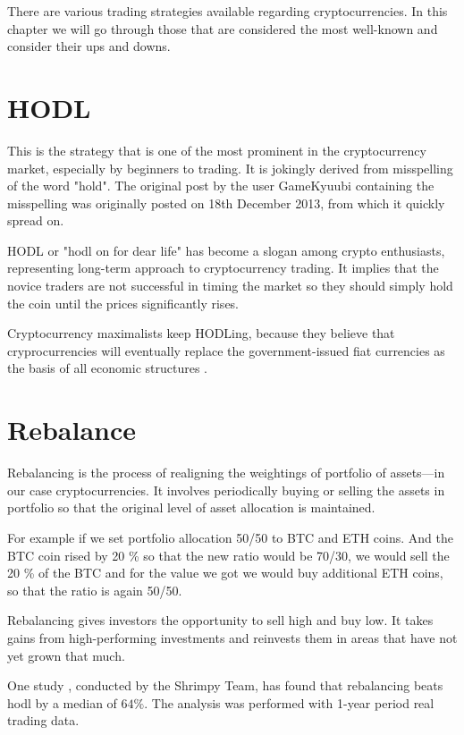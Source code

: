 There are various trading strategies available regarding cryptocurrencies.
In this chapter we will go through those that are considered the most well-known and consider
their ups and downs.

\section{HODL}

This is the strategy that is one of the most prominent in the cryptocurrency market, especially by beginners to trading.
It is jokingly derived from misspelling of the word "hold". The original post by the user GameKyuubi \cite{hodl-post} containing the misspelling was originally posted on 18th December 2013, from which it quickly spread on.

HODL or "hodl on for dear life" has become a slogan among crypto enthusiasts, representing long-term approach to cryptocurrency trading. It implies that the novice traders are not successful in timing the market so they should simply hold the coin until the prices significantly rises.

Cryptocurrency maximalists keep HODLing, because they believe that cryprocurrencies will eventually replace the government-issued fiat currencies as the basis of all economic structures \cite{investopedia-hodl}.

\section{Rebalance}
Rebalancing is the process of realigning the weightings of portfolio of assets---in our case cryptocurrencies. It involves periodically buying or selling the assets in portfolio so that the original level of asset allocation is maintained\cite{investopedia-rebalancing}.

For example if we set portfolio allocation 50/50 to BTC and ETH coins. And the BTC coin rised by 20 \% so that the new ratio would be 70/30, we would sell the 20 \% of the BTC and for the value we got we would buy additional ETH coins, so that the ratio is again 50/50.

Rebalancing gives investors the opportunity to sell high and buy low. It takes gains from high-performing investments and reinvests them in areas that have not yet grown that much.

One study \cite{portfolio-rebalancing}, conducted by the Shrimpy Team, has found that rebalancing beats hodl by a median of $64\%$. The analysis was performed with 1-year period real trading data.

